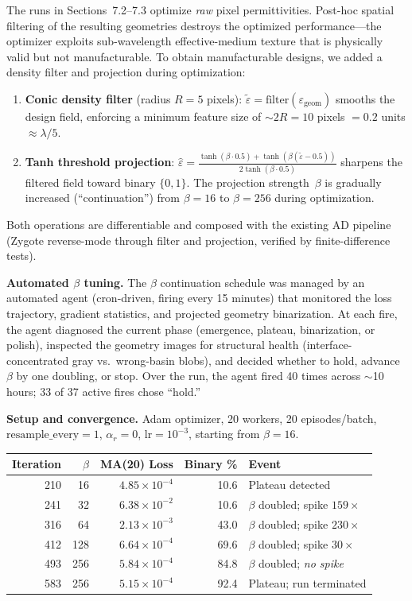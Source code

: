 \documentclass[11pt,a4paper]{article}
\begin{document}
The runs in Sections~7.2--7.3 optimize \emph{raw} pixel permittivities.  Post-hoc spatial filtering of the resulting geometries destroys the optimized performance---the optimizer exploits sub-wavelength effective-medium texture that is physically valid but not manufacturable.  To obtain manufacturable designs, we added a density filter and projection during optimization:
\begin{enumerate}[nosep]
  \item \textbf{Conic density filter} (radius $R = 5$ pixels): $\tilde{\varepsilon} = \text{filter}(\varepsilon_{\text{geom}})$ smooths the design field, enforcing a minimum feature size of $\sim 2R = 10$ pixels $= 0.2$ units $\approx \lambda/5$.
  \item \textbf{Tanh threshold projection}: $\hat{\varepsilon} = \frac{\tanh(\beta \cdot 0.5) + \tanh(\beta(\tilde{\varepsilon} - 0.5))}{2\tanh(\beta \cdot 0.5)}$ sharpens the filtered field toward binary $\{0, 1\}$.  The projection strength~$\beta$ is gradually increased (``continuation'') from $\beta = 16$ to $\beta = 256$ during optimization.
\end{enumerate}

Both operations are differentiable and composed with the existing AD pipeline (Zygote reverse-mode through filter and projection, verified by finite-difference tests).

\textbf{Automated $\beta$ tuning.}  The $\beta$ continuation schedule was managed by an automated agent (cron-driven, firing every 15 minutes) that monitored the loss trajectory, gradient statistics, and projected geometry binarization.  At each fire, the agent diagnosed the current phase (emergence, plateau, binarization, or polish), inspected the geometry images for structural health (interface-concentrated gray vs.\ wrong-basin blobs), and decided whether to hold, advance~$\beta$ by one doubling, or stop.  Over the run, the agent fired 40 times across $\sim$10 hours; 33 of 37 active fires chose ``hold.''

\textbf{Setup and convergence.}  Adam optimizer, 20 workers, 20 episodes/batch, $\text{resample\_every} = 1$, $\alpha_r = 0$, $\text{lr} = 10^{-3}$, starting from $\beta = 16$.

\begin{center}
\begin{tabular}{@{}rrrrl@{}}
\toprule
Iteration & $\beta$ & MA(20) Loss & Binary \% & Event \\
\midrule
210 & 16  & $4.85 \times 10^{-4}$ & 10.6 & Plateau detected \\
241 & 32  & $6.38 \times 10^{-2}$ & 10.6 & $\beta$ doubled; spike $159\times$ \\
316 & 64  & $2.13 \times 10^{-3}$ & 43.0 & $\beta$ doubled; spike $230\times$ \\
412 & 128 & $6.64 \times 10^{-4}$ & 69.6 & $\beta$ doubled; spike $30\times$ \\
493 & 256 & $5.84 \times 10^{-4}$ & 84.8 & $\beta$ doubled; \emph{no spike} \\
583 & 256 & $5.15 \times 10^{-4}$ & 92.4 & Plateau; run terminated \\
\bottomrule
\end{tabular}
\end{center}
\end{document}
